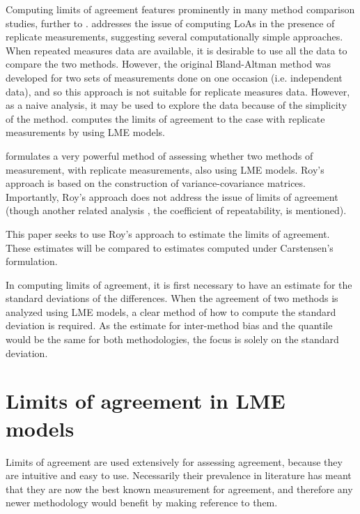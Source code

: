 \documentclass[12pt, a4paper]{report}
\theoremstyle{plain}
\theoremstyle{definition}
\theoremstyle{remark}
\begin{document}
\bigskip
		Computing limits of agreement features prominently in many method comparison studies, further to \citet{BA86,BA99}.
		\citet{BA99} addresses the issue of computing LoAs in the presence of replicate measurements, suggesting several computationally simple approaches. When repeated measures data are available, it is desirable to use
		all the data to compare the two methods. However, the original Bland-Altman method was developed for two sets of measurements done on one occasion (i.e. independent data), and so this approach is not suitable for replicate measures data. However, as a naive analysis, it may be used to explore the data because of the simplicity of the method.
		\citet{BXC2008}  computes the limits of agreement to the case with replicate measurements by using LME models.
		
		\citet{ARoy2009} formulates a very powerful method of assessing whether two methods of measurement, with replicate measurements, also using LME models. Roy's approach is based on the construction of variance-covariance matrices.
		Importantly, Roy's approach does not address the issue of limits of agreement (though another related analysis , the coefficient of repeatability, is mentioned).
		
		This paper seeks to use Roy's approach to estimate the limits of agreement. These estimates will be compared to estimates computed under Carstensen's formulation.
		
		In computing limits of agreement, it is first necessary to have an estimate for the standard deviations of the differences. When the agreement of two methods is analyzed using LME models, a clear method of how to compute the standard deviation is required. As the estimate for inter-method bias and the quantile would be the same for both methodologies, the focus is solely on the standard deviation.
	\section{Limits of agreement in LME models}
	
	Limits of agreement are used extensively for assessing agreement, because they are intuitive and easy to use.
	Necessarily their prevalence in literature has meant that they are now the best known measurement for agreement, and therefore any newer methodology would benefit by making reference to them.
	
\end{document}
